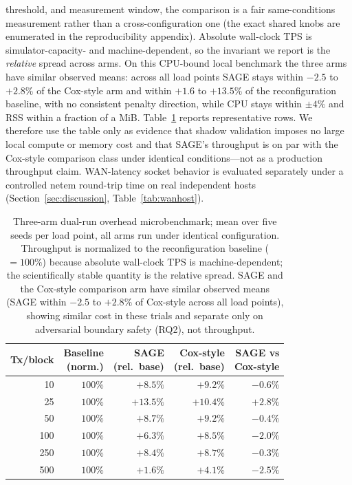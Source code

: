 \documentclass[journal]{IEEEtran}
\theoremstyle{definition}
\theoremstyle{remark}
\begin{document}
threshold, and measurement window, the comparison is a fair same-conditions measurement rather
than a cross-configuration one (the exact shared knobs are enumerated in the reproducibility
appendix). Absolute wall-clock TPS is simulator-capacity- and machine-dependent, so the invariant
we report is the \emph{relative} spread across arms. On this CPU-bound local benchmark the three
arms have similar observed means: across all load points SAGE stays within $-2.5$ to
$+2.8\%$ of the Cox-style arm and within $+1.6$ to $+13.5\%$ of the reconfiguration baseline, with
no consistent penalty direction, while CPU stays within $\pm4\%$ and RSS within a fraction of a
MiB. Table~\ref{tab:overhead} reports representative rows. We therefore use the table only as
evidence that shadow validation imposes no large local compute or memory cost and that SAGE's
throughput is on par with the Cox-style comparison class under identical conditions---not as a production
throughput claim. WAN-latency socket behavior is evaluated separately under a controlled netem
round-trip time on real independent hosts (Section~\ref{sec:discussion}, Table~\ref{tab:wanhost}).

\begin{table}[t]
\centering
\caption{Three-arm dual-run overhead microbenchmark; mean over
five seeds per load point, all arms run under identical configuration. Throughput is normalized to
the reconfiguration baseline ($=100\%$) because absolute wall-clock TPS is machine-dependent; the
scientifically stable quantity is the relative spread. SAGE and the Cox-style comparison arm have similar observed means (SAGE within $-2.5$ to $+2.8\%$ of Cox-style across all load
points), showing similar cost in these trials and separate only on
adversarial boundary safety (RQ2), not throughput.}
\label{tab:overhead}
\setlength{\tabcolsep}{5pt}
\footnotesize
\begin{tabular}{rrrrr}
\toprule
Tx/block & \makecell{Baseline\\(norm.)} & \makecell{SAGE\\(rel.\ base)} & \makecell{Cox-style\\(rel.\ base)} & \makecell{SAGE vs\\Cox-style} \\
\midrule
10  & $100\%$ & $+8.5\%$  & $+9.2\%$  & $-0.6\%$ \\
25  & $100\%$ & $+13.5\%$ & $+10.4\%$ & $+2.8\%$ \\
50  & $100\%$ & $+8.7\%$  & $+9.2\%$  & $-0.4\%$ \\
100 & $100\%$ & $+6.3\%$  & $+8.5\%$  & $-2.0\%$ \\
250 & $100\%$ & $+8.4\%$  & $+8.7\%$  & $-0.3\%$ \\
500 & $100\%$ & $+1.6\%$  & $+4.1\%$  & $-2.5\%$ \\
\bottomrule
\end{tabular}
\end{table}
\end{document}

